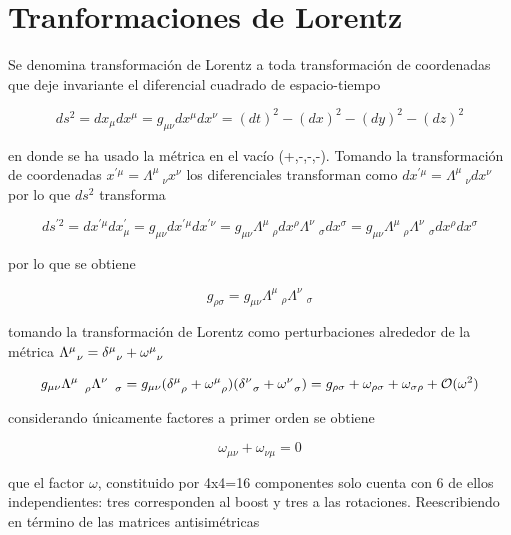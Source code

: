 \chapter{Tranformaciones de Lorentz}

Se denomina transformación de Lorentz a toda transformación de coordenadas que deje invariante el diferencial cuadrado de espacio-tiempo

$$ ds^2 = dx_{\mu}dx^{\mu} = g_{\mu\nu}dx^{\mu}dx^{\nu} = (dt)^2 - (dx)^2 -(dy)^2 -(dz)^2 $$

en donde se ha usado la métrica en el vacío (+,-,-,-). Tomando la transformación de coordenadas $x^{'\mu} = \Lambda_{\quad\nu}^{\mu}x^{\nu}$ los diferenciales transforman como $dx^{'\mu} = \Lambda_{\quad\nu}^{\mu}dx^{\nu}$ por lo que $ds^2$ transforma

$$ ds^{'2} = dx^{'\mu}dx_{\mu}^{'} = g_{\mu\nu}dx^{'\mu}dx^{'\nu} = g_{\mu\nu} \Lambda_{\quad\rho}^{\mu}dx^{\rho} \Lambda_{\quad\sigma}^{\nu}dx^{\sigma} = g_{\mu\nu}\Lambda_{\quad\rho}^{\mu}\Lambda_{\quad\sigma}^{\nu} dx^{\rho}dx^{\sigma} $$

por lo que se obtiene

$$ g_{\rho\sigma} = g_{\mu\nu}\Lambda_{\quad\rho}^{\mu}\Lambda_{\quad\sigma}^{\nu} $$

tomando la transformación de Lorentz como perturbaciones alrededor de la métrica $\Lambda_{\hspace{0.2cm}\nu}^{\mu} = \delta_{\hspace{0.2cm}\nu}^{\mu} + \omega_{\hspace{0.2cm}\nu}^{\mu}$

$$ g_{\mu\nu}\Lambda_{\quad\rho}^{\mu}\Lambda_{\quad\sigma}^{\nu} = g_{\mu\nu}(\delta_{\hspace{0.2cm}\rho}^{\mu} + \omega_{\hspace{0.2cm}\rho}^{\mu})(\delta_{\hspace{0.2cm}\sigma}^{\nu} + \omega_{\hspace{0.2cm}\sigma}^{\nu}) = g_{\rho\sigma} + \omega_{\rho\sigma} +\omega_{\sigma\rho} + \mathcal{O}(\omega^2) $$

considerando únicamente factores a primer orden se obtiene

\begin{equation}
    \omega_{\mu\nu} + \omega_{\nu\mu} = 0
    \label{oas}
\end{equation}

que el factor $\omega$, constituido por 4x4=16 componentes solo cuenta con 6 de ellos independientes: tres corresponden al boost y tres a las rotaciones. Reescribiendo en término de las matrices antisimétricas

